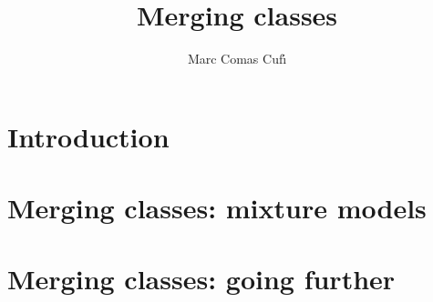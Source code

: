 \documentclass[10pt]{beamer}
\title{Merging classes}
\author{Marc Comas Cuf\'{\i}}
\date{}
\begin{document}
\begin{frame}
\titlepage
\end{frame}

\section{Introduction}



\section{Merging classes: mixture models}



\section{Merging classes: going further}




\end{document}
